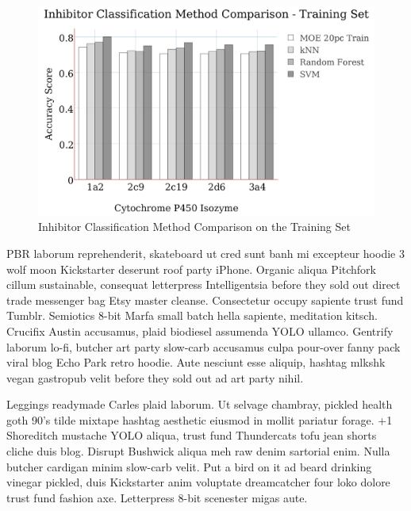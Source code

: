 \begin{figure}[!h]
\includegraphics[width=1\textwidth]{../img/method_comparison_training_set.png}
\caption{Inhibitor Classification Method Comparison on the Training Set}
\end{figure}

PBR laborum reprehenderit, skateboard ut cred sunt banh mi excepteur hoodie 3 wolf moon Kickstarter deserunt roof party iPhone. Organic aliqua Pitchfork cillum sustainable, consequat letterpress Intelligentsia before they sold out direct trade messenger bag Etsy master cleanse. Consectetur occupy sapiente trust fund Tumblr. Semiotics 8-bit Marfa small batch hella sapiente, meditation kitsch. Crucifix Austin accusamus, plaid biodiesel assumenda YOLO ullamco. Gentrify laborum lo-fi, butcher art party slow-carb accusamus culpa pour-over fanny pack viral blog Echo Park retro hoodie. Aute nesciunt esse aliquip, hashtag mlkshk vegan gastropub velit before they sold out ad art party nihil.

Leggings readymade Carles plaid laborum. Ut selvage chambray, pickled health goth 90's tilde mixtape hashtag aesthetic eiusmod in mollit pariatur forage. +1 Shoreditch mustache YOLO aliqua, trust fund Thundercats tofu jean shorts cliche duis blog. Disrupt Bushwick aliqua meh raw denim sartorial enim. Nulla butcher cardigan minim slow-carb velit. Put a bird on it ad beard drinking vinegar pickled, duis Kickstarter anim voluptate dreamcatcher four loko dolore trust fund fashion axe. Letterpress 8-bit scenester migas aute.

